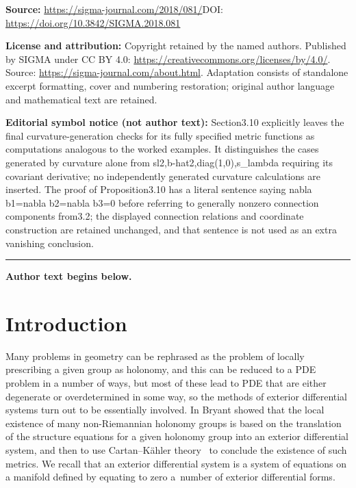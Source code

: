 \documentclass[11pt]{article}
\numberwithin{equation}{section}
\begin{document}
\noindent\textbf{Source:} \url{https://sigma-journal.com/2018/081/}\quad DOI: \url{https://doi.org/10.3842/SIGMA.2018.081}\par
\noindent\textbf{License and attribution:} Copyright retained by the named authors. Published by SIGMA under CC BY 4.0: \url{https://creativecommons.org/licenses/by/4.0/}. Source: \url{https://sigma-journal.com/about.html}. Adaptation consists of standalone excerpt formatting, cover and numbering restoration; original author language and mathematical text are retained.\par
\noindent\textbf{Editorial symbol notice (not author text):} Section3.10 explicitly leaves the final curvature-generation checks for its fully specified metric functions as computations analogous to the worked examples. It distinguishes the cases generated by curvature alone from sl2,b-hat2,diag(1,0),s\_lambda requiring its covariant derivative; no independently generated curvature calculations are inserted. The proof of Proposition3.10 has a literal sentence saying nabla b1=\allowbreak{}nabla b2=\allowbreak{}nabla b3=\allowbreak{}0 before referring to generally nonzero connection components from3.2; the displayed connection relations and coordinate construction are retained unchanged, and that sentence is not used as an extra vanishing conclusion.\par
\medskip\hrule\medskip\noindent\textbf{Author text begins below.}\par
\setcounter{section}{0}
\setcounter{subsection}{0}
\setcounter{subsubsection}{0}
\setcounter{Theorem}{0}
\setcounter{equation}{0}
\section{Introduction}

Many problems in geometry can be rephrased as the problem of locally prescribing a given group as holonomy, and this can be reduced to a PDE problem in a number of ways, but most of these lead to PDE that are either degenerate or overdetermined in some way, so the methods of exterior differential systems turn out to be essentially involved. In \cite{Bryant} Bryant showed that the local existence of many non-Riemannian holonomy groups is based on the translation of the structure equations for a given holonomy group into an exterior differential system, and then to use Cartan--K\"ahler theory~\cite{BCG} to conclude the existence of such metrics. We recall that an exterior differential system is a system of equations on a manifold defined by equating to zero a~number of exterior differential forms.
\end{document}
